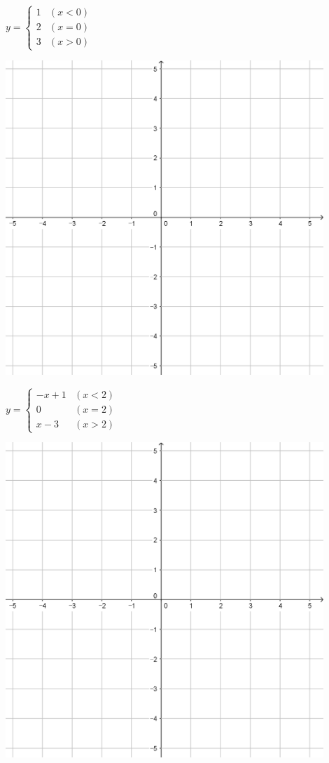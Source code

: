 \documentclass[a4paper]{oblivoir}
\begin{document}
\clearpage
\begin{minipage}{0.45\textwidth}\centering
\(y=\begin{cases}1&(x<0)\\2&(x=0)\\3&(x>0)\end{cases}\)
\par\bigskip\includegraphics[width=0.9\textwidth]{55}
\end{minipage}
\begin{minipage}{0.45\textwidth}\centering
\(y=\begin{cases}-x+1&(x<2)\\0&(x=2)\\x-3&(x>2)\end{cases}\)
\par\bigskip\includegraphics[width=0.9\textwidth]{55}
\end{minipage}\bigskip\bigskip\par
\end{document}
